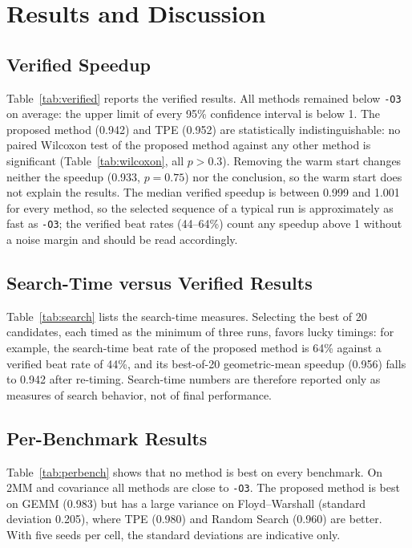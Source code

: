 \section{Results and Discussion}
\subsection{Verified Speedup}
Table~\ref{tab:verified} reports the verified results. All methods remained below \texttt{-O3} on average: the upper limit of every 95\% confidence interval is below 1. The proposed method (0.942) and TPE (0.952) are statistically indistinguishable: no paired Wilcoxon test of the proposed method against any other method is significant (Table~\ref{tab:wilcoxon}, all $p > 0.3$). Removing the warm start changes neither the speedup (0.933, $p = 0.75$) nor the conclusion, so the warm start does not explain the results. The median verified speedup is between 0.999 and 1.001 for every method, so the selected sequence of a typical run is approximately as fast as \texttt{-O3}; the verified beat rates (44--64\%) count any speedup above 1 without a noise margin and should be read accordingly.

\subsection{Search-Time versus Verified Results}
Table~\ref{tab:search} lists the search-time measures. Selecting the best of 20 candidates, each timed as the minimum of three runs, favors lucky timings: for example, the search-time beat rate of the proposed method is 64\% against a verified beat rate of 44\%, and its best-of-20 geometric-mean speedup (0.956) falls to 0.942 after re-timing. Search-time numbers are therefore reported only as measures of search behavior, not of final performance.

\subsection{Per-Benchmark Results}
Table~\ref{tab:perbench} shows that no method is best on every benchmark. On 2MM and covariance all methods are close to \texttt{-O3}. The proposed method is best on GEMM (0.983) but has a large variance on Floyd--Warshall (standard deviation 0.205), where TPE (0.980) and Random Search (0.960) are better. With five seeds per cell, the standard deviations are indicative only.

